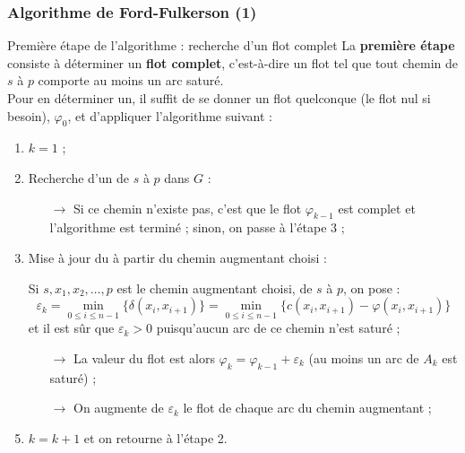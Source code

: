 \documentclass[french,10pt,t,handout]{beamer}
\begin{document}
\begin{frame}%
	\frametitle{Algorithme de Ford-Fulkerson (1)}
	\vspace{-0.2cm}
	
	\begin{block}{Premi\`ere \'etape de l'algorithme : recherche d'un flot complet}
		La \textbf{premi\`ere \'etape} consiste \`a d\'eterminer un \textbf{flot
		complet}, c'est-\`a-dire un flot tel que tout chemin de $s$ \`a $p$ comporte
		au moins un arc satur\'e. \\
		Pour en d\'eterminer un, il suffit de se donner un flot quelconque (le flot nul si besoin),
		$\varphi_0$, et d'appliquer l'algorithme suivant :
		\small
		\begin{enumerate}
		  \item $k = 1$ ;
		  \item Recherche d'un  de $s$ \`a $p$ dans
		  		$G$ : %
		  		\begin{itemize}
		  			\item[$\rightarrow$] Si ce chemin n'existe pas, c'est que le 
		  					   			 flot $\varphi_{k-1}$ est complet et 
		  					   			 l'algorithme est termin\'e ; 
		  					   			 sinon, on passe \`a l'\'etape 3 ;
		  		\end{itemize}
		  \item Mise \`a jour du  \`a partir du
		  chemin augmentant choisi :
		  \item[] Si $s,x_1,x_2,\ldots,p$ est le chemin augmentant choisi, de $s$ \`a
		  		  $p$, on pose :
		  	$$\varepsilon_k = \min_{0\leq i \leq n-1} \{\delta(x_i,x_{i+1})\} 
		  					= \min_{0\leq i \leq n-1} \{c(x_i,x_{i+1}) - \varphi(x_i,x_{i+1})\}$$ 
		  	 et il est s\^ur que $\varepsilon_k > 0$ puisqu'aucun arc de ce chemin
		  	 n'est satur\'e ;
			\begin{itemize}
			  \item[$\rightarrow$] La valeur du flot est alors $\varphi_k = \varphi_{k-1} + \varepsilon_k$ 
			  					   (au moins un arc de $A_k$ est satur\'e) ;
			  \item[$\rightarrow$] On augmente de $\varepsilon_k$ le flot de chaque arc
			  					   du chemin augmentant ;
			\end{itemize}
		  \item $k = k+1$ et on retourne \`a l'\'etape 2.
		\end{enumerate}
	\end{block}
\end{frame}
\end{document}
